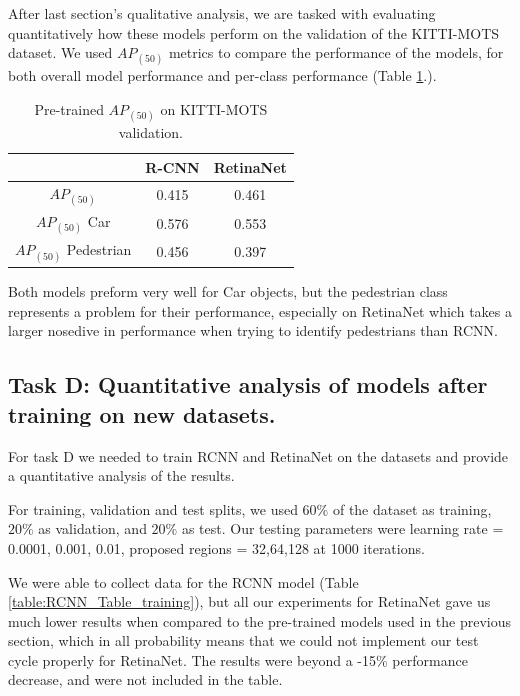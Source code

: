 \documentclass[12pt,a4paper,twocolumn,twoside]{article}
\begin{document}
After last section's qualitative analysis, we are tasked with evaluating
quantitatively how these models perform on the validation of the KITTI-MOTS dataset. We used 
$AP_{(50)}$ metrics to compare the performance of the models, for both 
overall model performance and per-class performance (Table \ref{table:KITTI_Table1}.). 

\begin{table}[ht]
    \centering
    \begin{tabular}{|c || c | c|} 
        \hline
          & \textbf{R-CNN} & \textbf{RetinaNet} \\ [0.8ex] 
          \hline
         $AP_{(50)}$ & 0.415 & 0.461  \\ 
         \hline
         $AP_{(50)}$ Car & 0.576 & 0.553 \\
         \hline
         $AP_{(50)}$ Pedestrian & 0.456 & 0.397 \\
         \hline
    \end{tabular}
    \caption{\label{table:KITTI_Table1}Pre-trained $AP_{(50)}$ on KITTI-MOTS validation.}
\end{table}

Both models preform very well for Car objects, but the pedestrian class
represents a problem for their performance, especially on RetinaNet
which takes a larger nosedive in performance when trying to identify pedestrians
than RCNN.

\subsection{Task D: Quantitative analysis of models after training on new datasets.}

For task D we needed to train RCNN and RetinaNet on the datasets and provide
a quantitative analysis of the results. 

For training, validation and test splits, we used $60\%$ of the dataset as training, $20\%$
as validation, and $20\%$ as test. 
Our testing parameters were learning rate = {0.0001, 0.001, 0.01}, 
proposed regions = {32,64,128} at 1000 iterations.

We were able to collect data for the RCNN model 
(Table \ref{table:RCNN_Table_training}), but 
all our experiments for RetinaNet gave us much lower results when compared to the pre-trained
models used in the previous section, which in all probability means that we could not
implement our test cycle properly for RetinaNet. The results were beyond a -15\% performance
decrease, and were not included in the table. 
\end{document}
